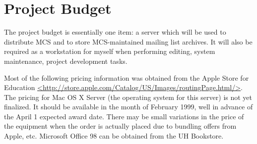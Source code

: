 
\section{Project Budget}

The project budget is essentially one item: a server which will be used to
distribute MCS and to store MCS-maintained mailing list archives. It will also
be required as a workstation for myself when performing editing, system
maintenance, project development tasks.

Most of the following pricing information was obtained from the Apple Store for
Education \url{<http://store.apple.com/Catalog/US/Images/routingPage.html/>}.
The pricing for Mac OS X Server (the operating system for this server) is not
yet finalized. It should be available in the month of February 1999, well in
advance of the April 1 expected award date. There may be small variations in
the price of the equipment when the order is actually placed due to bundling
offers from Apple, etc. Microsoft Office 98 can be obtained from the UH
Bookstore.

\vspace{1 in}

